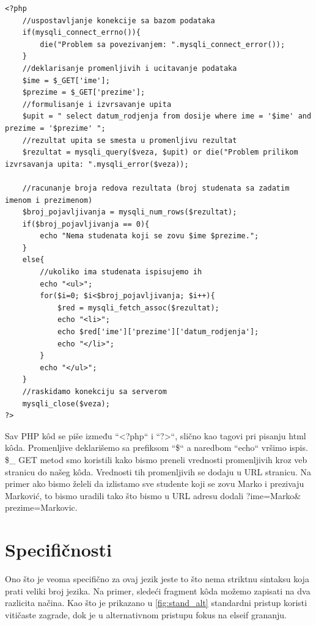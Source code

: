 \documentclass[a4paper]{article}
\begin{document}
{\begin{lstlisting}[caption={Primer PHP k\^{o}da},frame=single, label=primer_koda]
<?php
	//uspostavljanje konekcije sa bazom podataka
	if(mysqli_connect_errno()){
		die("Problem sa povezivanjem: ".mysqli_connect_error());
	}
	//deklarisanje promenljivih i ucitavanje podataka
	$ime = $_GET['ime'];
	$prezime = $_GET['prezime'];
	//formulisanje i izvrsavanje upita
	$upit = " select datum_rodjenja from dosije where ime = '$ime' and prezime = '$prezime' ";
	//rezultat upita se smesta u promenljivu rezultat
	$rezultat = mysqli_query($veza, $upit) or die("Problem prilikom izvrsavanja upita: ".mysqli_error($veza));
	
	//racunanje broja redova rezultata (broj studenata sa zadatim imenom i prezimenom)
	$broj_pojavljivanja = mysqli_num_rows($rezultat);
	if($broj_pojavljivanja == 0){
		echo "Nema studenata koji se zovu $ime $prezime.";	
	}
	else{
		//ukoliko ima studenata ispisujemo ih	
		echo "<ul>";
		for($i=0; $i<$broj_pojavljivanja; $i++){
			$red = mysqli_fetch_assoc($rezultat);
			echo "<li>";
			echo $red['ime']['prezime']['datum_rodjenja'];
			echo "</li>";		
		}
		echo "</ul>";
	}
	//raskidamo konekciju sa serverom
	mysqli_close($veza);
?>
\end{lstlisting}
Sav PHP k\^{o}d se piše između “<?php“ i “?>“, slično kao tagovi pri pisanju html k\^{o}da. Promenljive deklarišemo sa prefiksom “\$“ a naredbom “echo“ vršimo ispis. \$\_ GET metod smo koristili kako bismo preneli vrednosti promenljivih kroz veb stranicu do našeg k\^{o}da. Vrednosti tih promenljivih se dodaju u URL stranicu. Na primer ako bismo želeli da izlistamo sve studente koji se zovu Marko i prezivaju Marković, to bismo uradili tako što bismo u URL adresu dodali ?ime=Marko\& prezime=Markovic.

\section{Specifičnosti}

Ono što je veoma specifično za ovaj jezik jeste to što nema striktnu sintaksu koja prati veliki broj jezika. Na primer, sledeći fragment k\^{o}da možemo zapisati na dva razlicita načina. Kao što je prikazano u \ref{fig:stand_alt} standardni pristup koristi vitičaste zagrade, dok je u alternativnom pristupu fokus na elseif grananju. 

}
\end{document}
